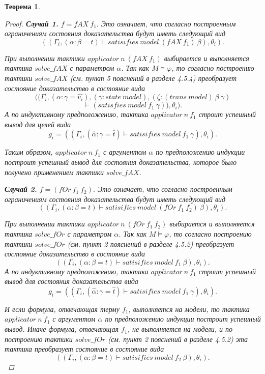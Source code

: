 \documentclass[12pt]{article}
\newtheorem{theorem}{Теорема}
\begin{document}
\begin{theorem}
\begin{proof}
\textbf{Случай 1.} $f=fAX\ f_1.$ Это означает, что согласно построенным ограничениям состояния доказательства будут иметь следующий вид 
$$((\Gamma_i, (\alpha: \beta=t) \vdash satisifies\ model\ (fAX\ f_1)\ \beta), \theta_i).$$


При выполнении тактики $applicator\ n\ (fAX\ f_1)$ выбирается и выполняется тактика $solve\_fAX$ с параметром $\alpha$.
Так как $M \models \varphi$, то
согласно построению тактики $solve\_fAX$ (см. пункт 5 пояснений в разделе 4.5.4) преобразует состояние доказательство в состояние вида
$$((\Gamma_i, (\alpha: \gamma=\hat{v_{i}}), (\gamma: state\ model), (\zeta: (trans\  model)\ \beta\ \gamma ) $$
    $$\vdash (satisfies\ model\ f_1\ \gamma)), \theta_i).$$
А по индуктивному предположению, тактика $applicator\ n\ f_1$ строит успешный вывод для целей вида $$g_i = ((\Gamma_i, (\hat{\alpha}: \gamma=\hat{t}) \vdash satisifies\ model\ f_1\ \gamma), \theta_i).$$

Таким образом, $applicator\ n\ f_1$ с аргументом ${\alpha}$ по предположению индукции построит успешный вывод для состояния доказательства, которое было получено применением тактики $solve\_fAX$.


\textbf{Случай 2.} $f=(fOr\ f_1\ f_2).$
Это означает, что согласно построенным ограничениям состояния доказательства будут иметь следующий вид 
$$((\Gamma_i, (\alpha: \beta=t) \vdash satisifies\ model\ (fOr\ f_1\ f_2)\ \beta), \theta_i).$$

При выполнении тактики $applicator\ n\ (fOr\ f_1\ f_2)$ выбирается и выполняется тактика $solve\_fOr$ с параметром $\alpha$.
Так как $M \models \varphi$, то
согласно построению тактики $solve\_fOr$ (см. пункт 2 пояснений в разделе 4.5.2) преобразует состояние доказательство в состояние вида
$$((\Gamma_i, (\alpha: \beta=t) \vdash satisifies\ model\ f_1\ \beta), \theta_i).$$
А по индуктивному предположению, тактика $applicator\ n\ f_1$
строит успешный вывод для состояния доказательства вида
$$g_i = ((\Gamma_i, (\hat{\alpha}: \gamma=\hat{t}) \vdash satisifies\ model\ f_1\ \gamma), \theta_i).$$


И если формула, отвечающая терму $f_1$, выполняется на модели, то тактика $applicator\ n\ f_1$ с аргументом ${\alpha}$ по предположению индукции построит успешный вывод.
Иначе формула, отвечающая $f_1$, не выполняется на модели, и по построению тактики $solve\_fOr$ (см. пункт 2 пояснений в разделе 4.5.2) эта тактика преобразует состояние в состояние вида
$$((\Gamma_i, (\alpha: \beta=t) \vdash satisifies\ model\ f_2\ \beta), \theta_i).$$ 


\end{proof}
\end{theorem}
\end{document}
